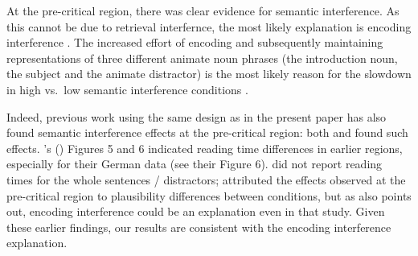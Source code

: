\documentclass[a4paper, man, floatsintext]{apa7}
\begin{document}
At the pre-critical region, there was clear evidence for semantic interference. As this cannot be due to retrieval interfernce, the most likely explanation is encoding interference \citep{Oberauer_Kliegl_2006}. The increased effort of encoding and subsequently maintaining representations of three different animate noun phrases (the introduction noun, the subject and the animate distractor) is the most likely reason for the slowdown in high vs.\ low semantic interference conditions \citep[for similar findings, see e.g., ][]{lago_etal_2021, kush_etal_2015, gordon02}. 

Indeed, previous work using the same design as in the present paper has also found semantic interference effects at the pre-critical region: both \cite{vandyke07} and \cite{mertzen} found such effects. \citeauthor{mertzen}'s (\citeyear{mertzen}) Figures 5 and 6 indicated reading time differences in earlier regions, especially for their German data (see their Figure 6). \cite{vandyke07} did not report reading times for the whole sentences / distractors;  \citeauthor{vandyke07} attributed the effects observed at the pre-critical region to plausibility differences between conditions, but as \cite{mertzen} also points out, encoding interference could be an explanation even in that study. Given these earlier findings, our results are consistent with the encoding interference explanation.
\end{document}
